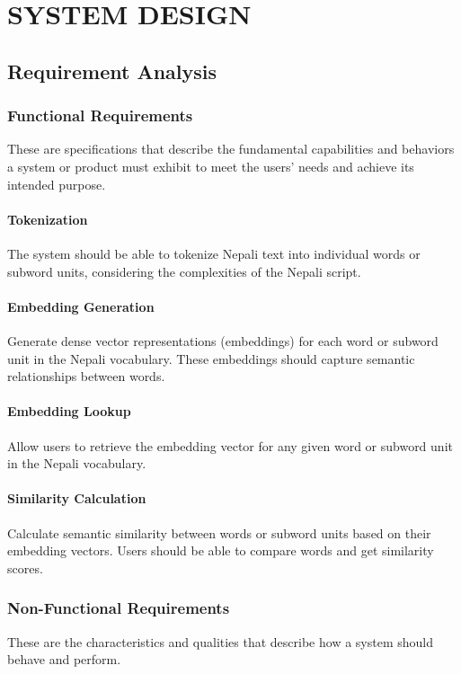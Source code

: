 \chapter{SYSTEM DESIGN}
\section{Requirement Analysis}
        \subsection{Functional Requirements}
            These are specifications that describe the fundamental capabilities and behaviors a system or product must exhibit to meet the users' needs and achieve its intended purpose. 

            \subsubsection{Tokenization}
            The system should be able to tokenize Nepali text into individual words or subword units, considering the complexities of the Nepali script.

            \subsubsection{Embedding Generation}
            Generate dense vector representations (embeddings) for each word or subword unit in the Nepali vocabulary. These embeddings should capture semantic relationships between words.

            \subsubsection{Embedding Lookup}
            Allow users to retrieve the embedding vector for any given word or subword unit in the Nepali vocabulary.

            \subsubsection{Similarity Calculation}
            Calculate semantic similarity between words or subword units based on their embedding vectors. Users should be able to compare words and get similarity scores.

        \subsection{Non-Functional Requirements}
            These are the characteristics and qualities that describe how a system should behave and perform.

